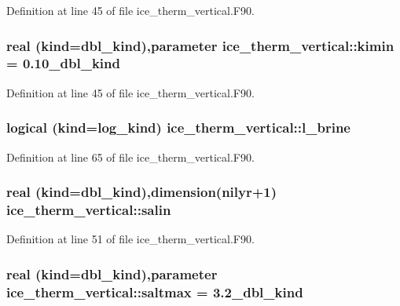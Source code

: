 Definition at line 45 of file ice\_\-therm\_\-vertical.F90.\hypertarget{namespaceice__therm__vertical_ac9c4fb671c6d11d24a29369d6c7410fa}{
\subsubsection[{kimin}]{\setlength{\rightskip}{0pt plus 5cm}real (kind=dbl\_\-kind),parameter {\bf ice\_\-therm\_\-vertical::kimin} = 0.10\_\-dbl\_\-kind}}
\label{namespaceice__therm__vertical_ac9c4fb671c6d11d24a29369d6c7410fa}


Definition at line 45 of file ice\_\-therm\_\-vertical.F90.\hypertarget{namespaceice__therm__vertical_aeb4df87d7011ce33c626c76f6a0dc063}{
\subsubsection[{l\_\-brine}]{\setlength{\rightskip}{0pt plus 5cm}logical (kind=log\_\-kind) {\bf ice\_\-therm\_\-vertical::l\_\-brine}}}
\label{namespaceice__therm__vertical_aeb4df87d7011ce33c626c76f6a0dc063}


Definition at line 65 of file ice\_\-therm\_\-vertical.F90.\hypertarget{namespaceice__therm__vertical_a484442c434b314140ae3763d41fc9075}{
\subsubsection[{salin}]{\setlength{\rightskip}{0pt plus 5cm}real (kind=dbl\_\-kind),dimension(nilyr+1) {\bf ice\_\-therm\_\-vertical::salin}}}
\label{namespaceice__therm__vertical_a484442c434b314140ae3763d41fc9075}


Definition at line 51 of file ice\_\-therm\_\-vertical.F90.\hypertarget{namespaceice__therm__vertical_abca199468a09d7af2a96e7ceb456b8c4}{
\subsubsection[{saltmax}]{\setlength{\rightskip}{0pt plus 5cm}real (kind=dbl\_\-kind),parameter {\bf ice\_\-therm\_\-vertical::saltmax} = 3.2\_\-dbl\_\-kind}}
\label{namespaceice__therm__vertical_abca199468a09d7af2a96e7ceb456b8c4}


